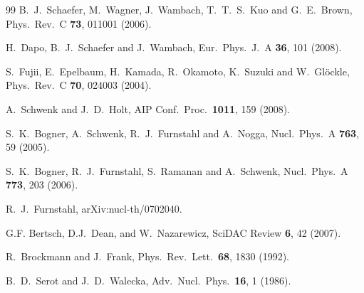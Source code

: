 \documentclass[aps,rmp,nofootinbib,twocolumn,floatfix]{revtex4}
\begin{document}
\begin{thebibliography}{99}
  B.~J.~Schaefer, M.~Wagner, J.~Wambach, T.~T.~S.~Kuo and G.~E.~Brown, 
  Phys.\ Rev.\  C {\bf 73}, 011001 (2006).
 

  H.~Dapo, B.~J.~Schaefer and J.~Wambach,
  Eur.\ Phys.\ J.\  A {\bf 36}, 101 (2008).

  S.~Fujii, E.~Epelbaum, H.~Kamada, R.~Okamoto, K.~Suzuki and W.~Gl\"ockle,
  Phys.\ Rev.\  C {\bf 70}, 024003 (2004).

  A.~Schwenk and J.~D.~Holt,
  AIP Conf.\ Proc.\  {\bf 1011}, 159 (2008).

  S.~K.~Bogner, A.~Schwenk, R.~J.~Furnstahl and A.~Nogga,
  Nucl.\ Phys.\  A {\bf 763}, 59 (2005).


  S.~K.~Bogner, R.~J.~Furnstahl, S.~Ramanan and A.~Schwenk,
  Nucl.\ Phys.\  A {\bf 773}, 203 (2006).

  R.~J.~Furnstahl, 
  arXiv:nucl-th/0702040. 
 
G.F. Bertsch, D.J.~Dean, and W.~Nazarewicz,
SciDAC Review {\bf 6}, 42 (2007).


  R.~Brockmann and J.~Frank,
  Phys.\ Rev.\ Lett.\  {\bf 68}, 1830 (1992).

  B.~D.~Serot and J.~D.~Walecka,
  Adv.\ Nucl.\ Phys.\  {\bf 16}, 1 (1986).


\end{thebibliography}
\end{document}
